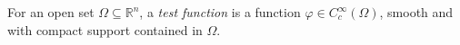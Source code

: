 
For an open set $\Omega\subseteq\mathbb R^n$, a \emph{test function} is a function $\varphi\in C_c^\infty(\Omega)$, smooth and with compact support contained in $\Omega$.
